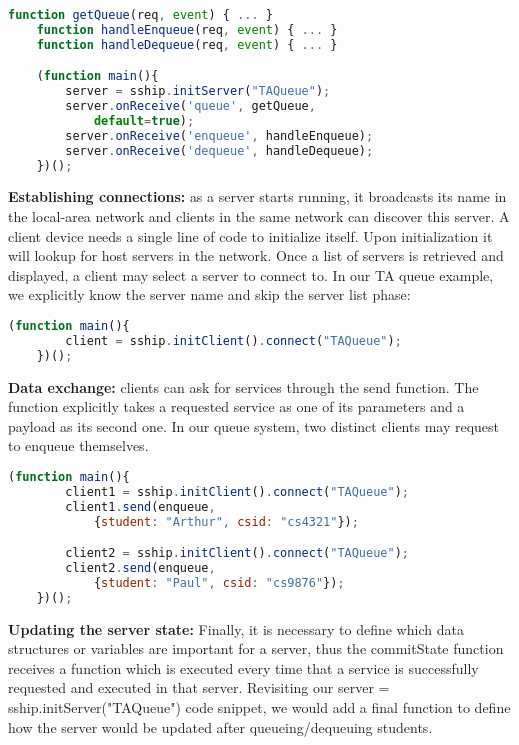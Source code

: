 \begin{lstlisting}[language=JavaScript]
    function getQueue(req, event) { ... }
    function handleEnqueue(req, event) { ... }
    function handleDequeue(req, event) { ... }

    (function main(){
        server = sship.initServer("TAQueue");
        server.onReceive('queue', getQueue, 
            default=true);
        server.onReceive('enqueue', handleEnqueue);
        server.onReceive('dequeue', handleDequeue);
    })();
\end{lstlisting}

{\bf Establishing connections: } as a server starts running, it broadcasts its name in the local-area network and clients in the same network can discover this server. A client device needs a single line of code to initialize itself. Upon initialization it will lookup for host servers in the network. Once a list of servers is retrieved and displayed, a client may select a server to connect to. In our TA queue example, we explicitly know the server name and skip the server list phase:

\begin{lstlisting}[language=JavaScript]
    (function main(){
        client = sship.initClient().connect("TAQueue");
    })();
\end{lstlisting}


{\bf Data exchange: } clients can ask for services through the {\ttfamily send} function. The function explicitly takes a requested service as one of its parameters and a payload as its second one. In our queue system, two distinct clients may request to enqueue themselves.

\begin{lstlisting}[language=JavaScript]
    (function main(){
        client1 = sship.initClient().connect("TAQueue");
        client1.send(enqueue, 
            {student: "Arthur", csid: "cs4321"});

        client2 = sship.initClient().connect("TAQueue");
        client2.send(enqueue, 
            {student: "Paul", csid: "cs9876"});
    })();
\end{lstlisting}

{\bf Updating the server state: } Finally, it is necessary to define which data structures or variables are important for a server, thus the {\ttfamily commitState} function receives a function which is executed every time that a service is successfully requested and executed in that server. Revisiting our {\ttfamily server = sship.initServer("TAQueue")} code snippet, we would add a final function to define how the server would be updated after queueing/dequeuing students.

